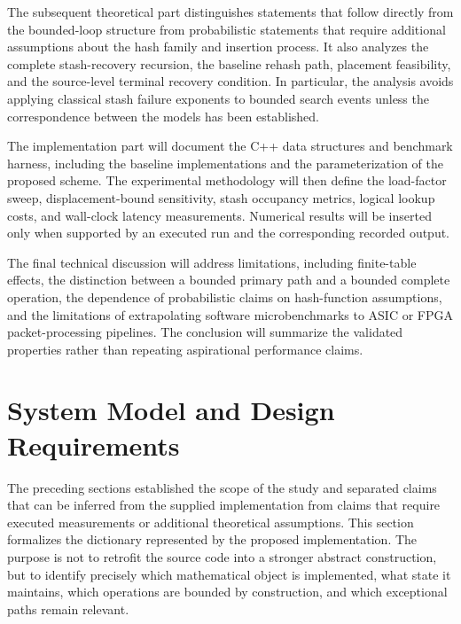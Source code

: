 \documentclass[conference]{IEEEtran}
\begin{document}
The subsequent theoretical part distinguishes statements that follow directly from the bounded-loop structure from probabilistic statements that require additional assumptions about the hash family and insertion process. It also analyzes the complete stash-recovery recursion, the baseline rehash path, placement feasibility, and the source-level terminal recovery condition. In particular, the analysis avoids applying classical stash failure exponents to bounded search events unless the correspondence between the models has been established.

The implementation part will document the C++ data structures and benchmark harness, including the baseline implementations and the parameterization of the proposed scheme. The experimental methodology will then define the load-factor sweep, displacement-bound sensitivity, stash occupancy metrics, logical lookup costs, and wall-clock latency measurements. Numerical results will be inserted only when supported by an executed run and the corresponding recorded output.

The final technical discussion will address limitations, including finite-table effects, the distinction between a bounded primary path and a bounded complete operation, the dependence of probabilistic claims on hash-function assumptions, and the limitations of extrapolating software microbenchmarks to ASIC or FPGA packet-processing pipelines. The conclusion will summarize the validated properties rather than repeating aspirational performance claims.

\section{System Model and Design Requirements}

The preceding sections established the scope of the study and separated claims that can be inferred from the supplied implementation from claims that require executed measurements or additional theoretical assumptions. This section formalizes the dictionary represented by the proposed implementation. The purpose is not to retrofit the source code into a stronger abstract construction, but to identify precisely which mathematical object is implemented, what state it maintains, which operations are bounded by construction, and which exceptional paths remain relevant.
\end{document}
